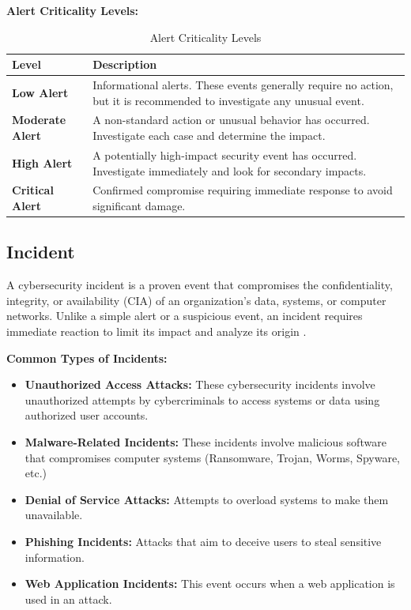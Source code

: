 \textbf{Alert Criticality Levels:}

\begin{table}[H]
\centering
\caption{Alert Criticality Levels}
\label{tab:alert-levels}
\renewcommand{\arraystretch}{1.4}
\begin{tabular}{>{\raggedright\arraybackslash}p{3cm} p{10.5cm}}
\toprule
\rowcolor{tableheader}
\textbf{Level} & \textbf{Description} \\
\midrule
\textbf{Low Alert} & Informational alerts. These events generally require no action, but it is recommended to investigate any unusual event. \\
\midrule
\textbf{Moderate Alert} & A non-standard action or unusual behavior has occurred. Investigate each case and determine the impact. \\
\midrule
\textbf{High Alert} & A potentially high-impact security event has occurred. Investigate immediately and look for secondary impacts. \\
\midrule
\textbf{Critical Alert} & Confirmed compromise requiring immediate response to avoid significant damage. \\
\bottomrule
\end{tabular}
\end{table}

\subsection{Incident}
\label{subsec:incident}

A cybersecurity incident is a proven event that compromises the confidentiality, integrity, or availability (CIA) of an organization's data, systems, or computer networks. Unlike a simple alert or a suspicious event, an incident requires immediate reaction to limit its impact and analyze its origin \cite{ref28} \cite{ref29}.

\textbf{Common Types of Incidents:}

\begin{itemize}
    \item \textbf{Unauthorized Access Attacks:} These cybersecurity incidents involve unauthorized attempts by cybercriminals to access systems or data using authorized user accounts.
    \item \textbf{Malware-Related Incidents:} These incidents involve malicious software that compromises computer systems (Ransomware, Trojan, Worms, Spyware, etc.)
    \item \textbf{Denial of Service Attacks:} Attempts to overload systems to make them unavailable.
    \item \textbf{Phishing Incidents:} Attacks that aim to deceive users to steal sensitive information.
    \item \textbf{Web Application Incidents:} This event occurs when a web application is used in an attack.
\end{itemize}

